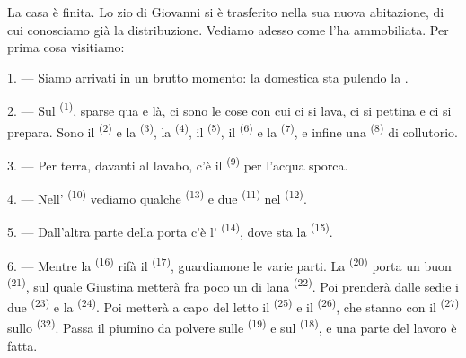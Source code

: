 \VUsaut{6.0mm}
\VUsaut{1.4mm}
\VUsaut{0.4mm}
\VUsaut{2.2mm}

La casa è finita. Lo zio di Giovanni si è trasferito nella sua nuova abitazione, di
cui conosciamo già la distribuzione. Vediamo adesso come l'ha ammobiliata. Per prima
cosa visitiamo:

\VUsaut{3.0mm}

1. --- Siamo arrivati in un brutto momento: la domestica sta pulendo la
.

2. --- Sul  \textsuperscript{(1)}, sparse qua e là, ci sono le cose con
cui ci si lava, ci si pettina e ci si prepara. Sono il 
\textsuperscript{(2)} e la  \textsuperscript{(3)}, la
 \textsuperscript{(4)}, il  \textsuperscript{(5)}, il
 \textsuperscript{(6)} e la  \textsuperscript{(7)}, e
infine una  \textsuperscript{(8)} di collutorio.

3. --- Per terra, davanti al lavabo, c'è il  \textsuperscript{(9)} per
l'acqua sporca.

4. --- Nell' \textsuperscript{(10)} vediamo qualche
 \textsuperscript{(13)} e due 
\textsuperscript{(11)} nel  \textsuperscript{(12)}.

5. --- Dall'altra parte della porta c'è l'
\textsuperscript{(14)}, dove sta la  \textsuperscript{(15)}.

6. --- Mentre la  \textsuperscript{(16)} rifà il 
\textsuperscript{(17)}, guardiamone le varie parti. La 
\textsuperscript{(20)} porta un buon 
\textsuperscript{(21)}, sul quale Giustina metterà fra poco un  di
lana \textsuperscript{(22)}. Poi prenderà dalle sedie i due 
\textsuperscript{(23)} e la  \textsuperscript{(24)}. Poi metterà a capo
del letto il  \textsuperscript{(25)} e il 
\textsuperscript{(26)}, che stanno con il  \textsuperscript{(27)} sullo
 \textsuperscript{(32)}. Passa il piumino da polvere sulle
 \textsuperscript{(19)} e sul 
\textsuperscript{(18)}, e una parte del lavoro è fatta.

